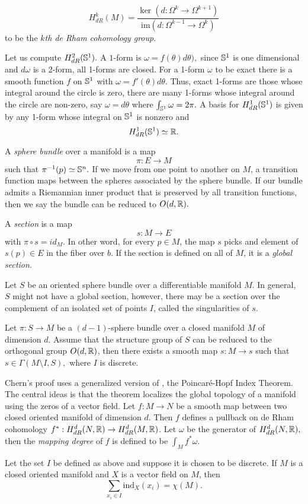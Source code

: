 $$H_{dR}^k(M)=\frac{\ker(d:\Omega^{k}\rightarrow \Omega^{k+1})}{\text{im}(d:\Omega^{k-1}\rightarrow \Omega^k)}$$
to be the \emph{$k$th de Rham cohomology group}.

Let us compute $H_{dR}^2(\mathbb{S}^1).$ A $1$-form is $\omega=f(\theta)d\theta),$ since $\mathbb{S}^1$ is one
dimensional and $d\omega$ is a 2-form, all 1-forms are closed. For a 1-form $\omega$ to be exact
there is a smooth function $f$ on $\mathbb{S}^1$ with $\omega=f'(\theta)d\theta$.
Thus, exact 1-forms are those whose integral around the circle is zero, there are many 1-forms
whose integral around the circle are non-zero, say $\omega=d\theta$ where $\int_{\mathbb{S}^1}\omega=2\pi.$
A basis for $H_{dR}^1(\mathbb{S}^1)$ is given by any 1-form whose integral on $\mathbb{S}^1$ is nonzero and
$$H_{dR}^1(\mathbb{S}^1)\simeq \mathbb{R}.$$



A \emph{sphere bundle} over a manifold is a map
$$\pi:E\rightarrow M$$
such that $\pi^{-1}(p)\simeq \mathbb{S}^n.$ 
If we move from one point to another on $M$, a transition function
maps between the spheres associated by the sphere bundle.
If our bundle admits a Riemannian inner product that is preserved
by all transition functions, then we say the bundle can be reduced to $O(d,\mathbb{R}).$

A \emph{section}
is a map
$$s:M\rightarrow E$$
with $\pi \circ s = id_M.$ In other word, for every $p\in M$,
the map $s$ picks and element of $s(p)\in E$ in the fiber over $b$.
If the section is defined on all of $M$, it is a \emph{global section}.

Let $S$ be an oriented sphere bundle over a differentiable manifold $M$.
In general, $S$ might not have a global section, however, there may be a section over
the complement of an isolated set of points $I$, called the singularities of $s$.

\begin{theorem}[Singularities]
Let $\pi: S\rightarrow M$ be a $(d-1)$-sphere bundle over a closed manifold $M$ of dimension $d$.
Assume that the structure group of $S$ can be reduced to the orthogonal group $O(d,\mathbb{R})$, then there exists
a smooth map $s:M\rightarrow s$ such that $s\in \Gamma(M\setminus I, S),$ where $I$ is discrete.
\end{theorem}

Chern's proof uses a generalized version of , the Poincar\'e-Hopf Index Theorem.
The central ideas is that the theorem localizes the global topology of a manifold using the zeros of a vector field.
Let $f:M\rightarrow N$ be a smooth map between two closed oriented manifold of dimension $d$.
Then $f$ defines a pullback on de Rham cohomology $f^*:H_{dR}^d(N,\mathbb{R})\rightarrow H_{dR}^d(M,\mathbb{R})$.
Let $\omega$ be the generator of $H_{dR}^d(N,\mathbb{R}),$ then the \emph{mapping degree}
of $f$ is defined to be $\int_Mf^*\omega.$

\begin{theorem}\label{thm:gph}
Let the set $I$ be defined as above and suppose it is chosen to be discrete.
If $M$ is a closed oriented manifold and $X$ is a vector field on $M$, then
$$\sum_{x_i\in I} \text{ind}_X(x_i)=\chi(M).$$
\end{theorem}


